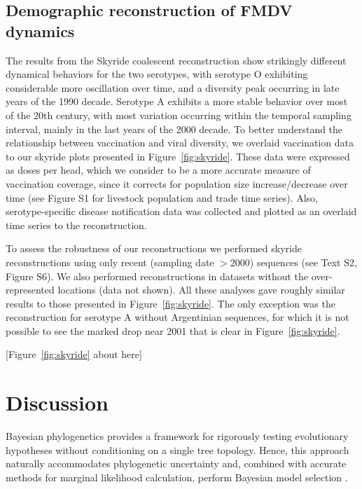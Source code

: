 \documentclass[10pt]{article}
\begin{document}
\subsection*{Demographic reconstruction of FMDV dynamics}

The results from the Skyride coalescent reconstruction show strikingly different dynamical behaviors for the two serotypes, with serotype O exhibiting considerable more oscillation over time, and a diversity peak occurring in late years of the 1990 decade.
Serotype A exhibits a more stable behavior over most of the 20th century, with most variation occurring within the temporal sampling interval, mainly in the last years of the 2000 decade.
To better understand the relationship between vaccination and viral diversity, we overlaid vaccination data to our skyride plots presented in Figure~\ref{fig:skyride}.
These data were expressed as doses per head, which we consider to be a more accurate measure of vaccination coverage, since it corrects for population size increase/decrease over time (see Figure S1 for livestock population and trade time series). %
Also, serotype-specific disease notification data was collected and plotted as an overlaid time series to the reconstruction. 

To assess the robustness of our reconstructions we performed skyride reconstructions using only recent (sampling date $>2000$) sequences (see Text S2, Figure S6).
We also performed reconstructions in datasets without the over-represented locations (data not shown). All these analyses gave roughly similar results to those presented in Figure~\ref{fig:skyride}. The only exception was the reconstruction for serotype A without Argentinian sequences, for which it is not possible to see the marked drop near 2001 that is clear in Figure~\ref{fig:skyride}. 

\begin{center}
 [Figure~\ref{fig:skyride} about here]
\end{center}

\section*{Discussion}
Bayesian phylogenetics provides a framework for rigorously testing evolutionary hypotheses without conditioning on a single tree topology. Hence, this approach naturally accommodates phylogenetic uncertainty and, combined with accurate methods for marginal likelihood calculation, perform Bayesian model selection \cite{Baele2012,Baele2013a,Baele2013b}.
\end{document}
